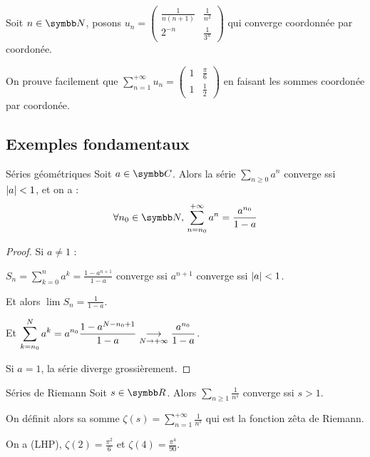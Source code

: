 \begin{exemple}
    Soit $n \in \N$, posons $u_n = 
    \begin{pmatrix}
        \frac 1 {n(n+1)} & \frac 1 {n^2}\\
        2^{-n} & \frac 1 {3^n}
    \end{pmatrix}
    $ qui converge coordonnée par coordonée.

    On prouve facilement que $\sum_{n=1}^{+ \infty} u_n =
    \begin{pmatrix}
        1 & \frac {\pi} 6\\
        1 & \frac 1 2
    \end{pmatrix}$ en faisant les sommes coordonée par coordonée.
\end{exemple}

\subsection{Exemples fondamentaux}

\begin{theoreme}{Séries géométriques}{}
    Soit $a \in \C$. Alors la série $\sum_{n \geqslant 0} a^n$ converge ssi $\left|a\right| < 1$, 
    et on a : \[\forall n_0 \in \N, \, \sum_{n = n_0}^{+ \infty} a^n = \frac{a^{n_0}}{1 - a}\]
\end{theoreme}


\begin{proof}
    Si $a \neq 1$ : 

    $\displaystyle S_n = \sum_{k = 0}^{n } a^k = \frac{1 - a^{n+1}}{1 - a}$ converge ssi 
    $a^{n+1} $ converge ssi $\left|a\right| < 1$.

    Et alors $\lim S_n = \frac{1}{1 - a}$.

    Et $\displaystyle \sum_{k = n_0 }^{N} a^k = a^{n_0} \frac{1 - a^{N - n_0 + 1}}{1 - a} \underset{N \to + \infty}{\longrightarrow} \frac{a^{n_0}}{1 - a}$.

    Si $a = 1$, la série diverge grossièrement.
\end{proof}

\begin{theoreme}{Séries de Riemann}{}
    Soit $s \in \R$. Alors $\displaystyle \sum_{n \geqslant 1} \frac{1}{n^s}$ converge ssi $s > 1$.

    On définit alors sa somme $\displaystyle \zeta(s) = \sum_{n = 1}^{+\infty} \frac{1}{n^s}$ qui est la fonction zêta de Riemann.
    
    On a (LHP), $\zeta(2) = \frac{\pi^2}{6}$ et $\zeta(4) = \frac{\pi^4}{90}$.
\end{theoreme}

